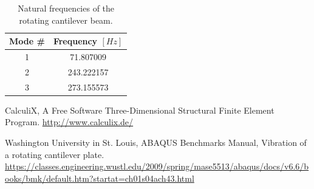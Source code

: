 \documentclass[12pt, a4paper, twoside]{article}
\begin{document}
\begin{table}[ht]
	\caption{Natural frequencies of the rotating cantilever beam.}%
	\centering %
	\begin{tabular}{c c}%
		\hline\hline                        %
		Mode \# & Frequency $[Hz]$ \\ [0.5ex]%
		\hline\hline                 %
		1 & 71.807009 \\%
		2 & 243.222157 \\
		3 & 273.155573 \\[1ex]      %
		\hline%
	\end{tabular}
	\label{table:freqs}%
\end{table}


\clearpage
\begin{thebibliography}{9}
	
CalculiX, A Free Software Three-Dimensional Structural Finite Element Program. \url{http://www.calculix.de/}


Washington University in St. Louis, ABAQUS Benchmarks Manual, Vibration of a rotating cantilever plate. \url{https://classes.engineering.wustl.edu/2009/spring/mase5513/abaqus/docs/v6.6/books/bmk/default.htm?startat=ch01s04ach43.html}

\end{thebibliography}
\end{document}
